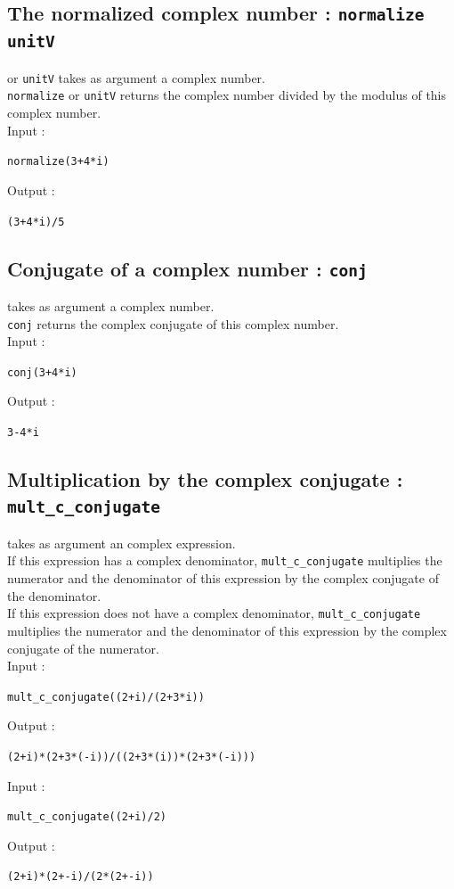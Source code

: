 \documentclass[a4paper,11pt]{book}
\begin{document}
\subsection{The normalized complex number : {\tt normalize unitV}}
 or {\tt unitV} takes as argument a complex number.\\
{\tt normalize} or {\tt unitV} returns the complex number divided by the
modulus of this complex number.\\
Input :
\begin{center}{\tt normalize(3+4*i)}\end{center}
Output :
\begin{center}{\tt (3+4*i)/5}\end{center}

\subsection{Conjugate of a complex number : {\tt conj}}
 takes as argument a complex number.\\
{\tt conj} returns the complex conjugate of this complex number.\\
Input :
\begin{center}{\tt conj(3+4*i)}\end{center}
Output :
\begin{center}{\tt 3-4*i}\end{center}

\subsection{Multiplication by the complex conjugate  :
 {\tt mult\_c\_conjugate}}
 takes as argument an complex expression.\\ 
If this expression has a complex denominator,
{\tt mult\_c\_conjugate} multiplies the numerator and the denominator of this 
 expression by the complex conjugate of the denominator.\\
If this  expression does not have a complex denominator,
{\tt mult\_c\_conjugate} multiplies the numerator and the denominator of this 
expression by the complex conjugate of the numerator.\\
Input :
\begin{center}{\tt mult\_c\_conjugate((2+i)/(2+3*i))}\end{center}
Output :
\begin{center}{\tt (2+i)*(2+3*(-i))/((2+3*(i))*(2+3*(-i)))}\end{center}
Input :
\begin{center}{\tt mult\_c\_conjugate((2+i)/2)}\end{center}
Output :
\begin{center}{\tt (2+i)*(2+-i)/(2*(2+-i))}\end{center}
\end{document}
